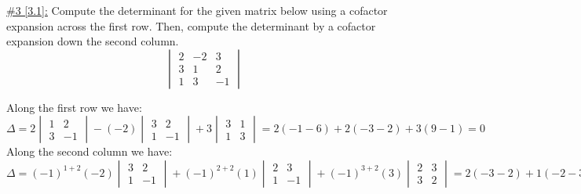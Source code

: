 \documentclass{exam}
\begin{document}
\underline{\#3 [3.1]:} Compute the determinant for the given matrix below using a cofactor expansion across the first row. Then, compute the determinant by a cofactor expansion down the second column.
\[
    \begin{vmatrix}
        2 & -2 & 3 \\
        3 & 1 & 2 \\
        1 & 3 & -1
    \end{vmatrix} 
\]
\begin{solution}
    Along the first row we have:
    \[
        \Delta = 2\begin{vmatrix}
            1 & 2 \\ 3 & -1 
        \end{vmatrix}
        - (-2)\begin{vmatrix}
            3 & 2 \\ 1 & -1
        \end{vmatrix}
        + 3\begin{vmatrix}
            3 & 1 \\ 1 & 3
        \end{vmatrix}
        = 2(-1 - 6) + 2(-3 - 2) + 3(9-1) = \boxed{0}
    \]
    Along the second column we have: 
    \[
        \Delta = (-1)^{1+2}(-2)\begin{vmatrix}
            3 & 2 \\ 1 & -1 
        \end{vmatrix}
        + (-1)^{2+2}(1)\begin{vmatrix}
            2 & 3 \\ 1 & -1 
        \end{vmatrix}
        + (-1)^{3+2}(3)\begin{vmatrix}
            2 & 3 \\ 3 & 2
        \end{vmatrix}
        = 2(-3 - 2) + 1(-2 - 3) - 3(4 - 9) = \boxed{0}
    \]
\end{solution}
\end{document}
